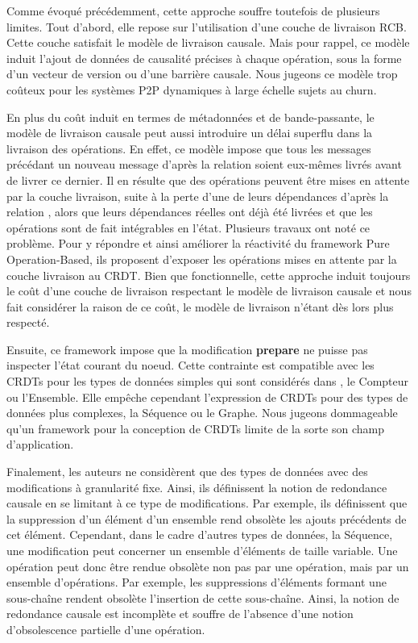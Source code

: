 Comme évoqué précédemment, cette approche souffre toutefois de plusieurs limites.
Tout d'abord, elle repose sur l'utilisation d'une couche de livraison \ac{RCB}.
Cette couche satisfait le modèle de livraison causale.
Mais pour rappel, ce modèle induit l'ajout de données de causalité précises à chaque opération, sous la forme d'un vecteur de version ou d'une barrière causale.
Nous jugeons ce modèle trop coûteux pour les systèmes \ac{P2P} dynamiques à large échelle sujets au churn.

En plus du coût induit en termes de métadonnées et de bande-passante, le modèle de livraison causale peut aussi introduire un délai superflu dans la livraison des opérations.
En effet, ce modèle impose que tous les messages précédant un nouveau message d'après la relation \hb soient eux-mêmes livrés avant de livrer ce dernier.
Il en résulte que des opérations peuvent être mises en attente par la couche livraison, \eg suite à la perte d'une de leurs dépendances d'après la relation \hb, alors que leurs dépendances réelles ont déjà été livrées et que les opérations sont de fait intégrables en l'état.
Plusieurs travaux \cite{2020-flec-bauwens,2021-improving-reactivity-pure-op-based-crdts-bauwens} ont noté ce problème.
Pour y répondre et ainsi améliorer la réactivité du framework Pure Operation-Based, ils proposent d'exposer les opérations mises en attente par la couche livraison au \ac{CRDT}.
Bien que fonctionnelle, cette approche induit toujours le coût d'une couche de livraison respectant le modèle de livraison causale et nous fait considérer la raison de ce coût, le modèle de livraison n'étant dès lors plus respecté.

Ensuite, ce framework impose que la modification \textbf{prepare} ne puisse pas inspecter l'état courant du noeud.
Cette contrainte est compatible avec les \acp{CRDT} pour les types de données simples qui sont considérés dans \cite{baquero2017pure}, \eg le Compteur ou l'Ensemble.
Elle empêche cependant l'expression de \acp{CRDT} pour des types de données plus complexes, \eg la Séquence ou le Graphe.
Nous jugeons dommageable qu'un framework pour la conception de \acp{CRDT} limite de la sorte son champ d'application.

Finalement, les auteurs ne considèrent que des types de données avec des modifications à granularité fixe.
Ainsi, ils définissent la notion de redondance causale en se limitant à ce type de modifications.
Par exemple, ils définissent que la suppression d'un élément d'un ensemble rend obsolète les ajouts précédents de cet élément.
Cependant, dans le cadre d'autres types de données, \eg la Séquence, une modification peut concerner un ensemble d'éléments de taille variable.
Une opération peut donc être rendue obsolète non pas par une opération, mais par un ensemble d'opérations.
Par exemple, les suppressions d'éléments formant une sous-chaîne rendent obsolète l'insertion de cette sous-chaîne.
Ainsi, la notion de redondance causale est incomplète et souffre de l'absence d'une notion d'obsolescence partielle d'une opération.\\

